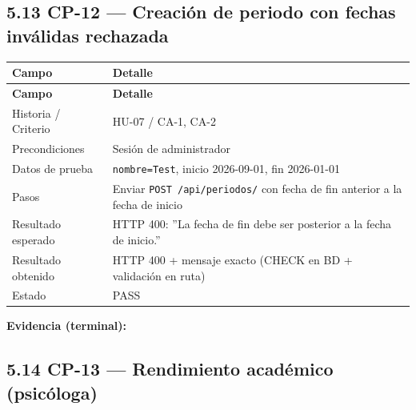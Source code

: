 \documentclass[11pt,a4paper]{article}
\begin{document}
\subsection*{5.13 CP-12 --- Creación de periodo con fechas inválidas rechazada}


{\small
\begin{longtable}{|p{}|p{}|}
\rowcolor{UTECblue}\color{white}\bfseries Campo & \color{white}\bfseries Detalle \\ \hline
\endfirsthead
\rowcolor{UTECblue}\color{white}\bfseries Campo & \color{white}\bfseries Detalle \\ \hline
\endhead
Historia / Criterio & HU-07 / CA-1, CA-2 \\ \hline
Precondiciones & Sesión de administrador \\ \hline
Datos de prueba & \texttt{nombre=Test}, inicio 2026-09-01, fin 2026-01-01 \\ \hline
Pasos & Enviar \texttt{POST /api/periodos/} con fecha de fin anterior a la fecha de inicio \\ \hline
Resultado esperado & HTTP 400: ''La fecha de fin debe ser posterior a la fecha de inicio.'' \\ \hline
Resultado obtenido & HTTP 400 + mensaje exacto (CHECK en BD + validación en ruta) \\ \hline
Estado & {\color{green!60!black}{$\checkmark$}} PASS \\ \hline
\end{longtable}}


\textbf{Evidencia (terminal):}


\subsection*{5.14 CP-13 --- Rendimiento académico (psicóloga)}
\end{document}
